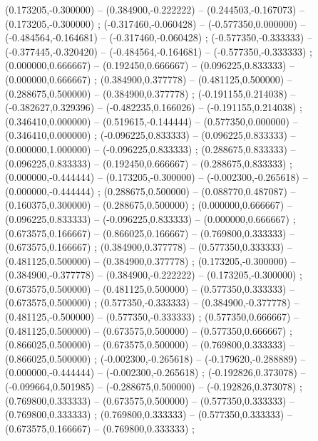    (0.173205,-0.300000) -- (0.384900,-0.222222) -- (0.244503,-0.167073) -- (0.173205,-0.300000) ;
   (-0.317460,-0.060428) -- (-0.577350,0.000000) -- (-0.484564,-0.164681) -- (-0.317460,-0.060428) ;
   (-0.577350,-0.333333) -- (-0.377445,-0.320420) -- (-0.484564,-0.164681) -- (-0.577350,-0.333333) ;
   (0.000000,0.666667) -- (0.192450,0.666667) -- (0.096225,0.833333) -- (0.000000,0.666667) ;
   (0.384900,0.377778) -- (0.481125,0.500000) -- (0.288675,0.500000) -- (0.384900,0.377778) ;
   (-0.191155,0.214038) -- (-0.382627,0.329396) -- (-0.482235,0.166026) -- (-0.191155,0.214038) ;
   (0.346410,0.000000) -- (0.519615,-0.144444) -- (0.577350,0.000000) -- (0.346410,0.000000) ;
   (-0.096225,0.833333) -- (0.096225,0.833333) -- (0.000000,1.000000) -- (-0.096225,0.833333) ;
   (0.288675,0.833333) -- (0.096225,0.833333) -- (0.192450,0.666667) -- (0.288675,0.833333) ;
   (0.000000,-0.444444) -- (0.173205,-0.300000) -- (-0.002300,-0.265618) -- (0.000000,-0.444444) ;
   (0.288675,0.500000) -- (0.088770,0.487087) -- (0.160375,0.300000) -- (0.288675,0.500000) ;
   (0.000000,0.666667) -- (0.096225,0.833333) -- (-0.096225,0.833333) -- (0.000000,0.666667) ;
   (0.673575,0.166667) -- (0.866025,0.166667) -- (0.769800,0.333333) -- (0.673575,0.166667) ;
   (0.384900,0.377778) -- (0.577350,0.333333) -- (0.481125,0.500000) -- (0.384900,0.377778) ;
   (0.173205,-0.300000) -- (0.384900,-0.377778) -- (0.384900,-0.222222) -- (0.173205,-0.300000) ;
   (0.673575,0.500000) -- (0.481125,0.500000) -- (0.577350,0.333333) -- (0.673575,0.500000) ;
   (0.577350,-0.333333) -- (0.384900,-0.377778) -- (0.481125,-0.500000) -- (0.577350,-0.333333) ;
   (0.577350,0.666667) -- (0.481125,0.500000) -- (0.673575,0.500000) -- (0.577350,0.666667) ;
   (0.866025,0.500000) -- (0.673575,0.500000) -- (0.769800,0.333333) -- (0.866025,0.500000) ;
   (-0.002300,-0.265618) -- (-0.179620,-0.288889) -- (0.000000,-0.444444) -- (-0.002300,-0.265618) ;
   (-0.192826,0.373078) -- (-0.099664,0.501985) -- (-0.288675,0.500000) -- (-0.192826,0.373078) ;
   (0.769800,0.333333) -- (0.673575,0.500000) -- (0.577350,0.333333) -- (0.769800,0.333333) ;
   (0.769800,0.333333) -- (0.577350,0.333333) -- (0.673575,0.166667) -- (0.769800,0.333333) ;
